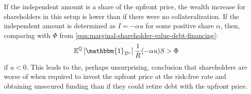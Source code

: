 \documentclass[../main.tex]{subfiles}
\begin{document}
        If the independent amount is a share of the upfront price, 
        the wealth increase for shareholders in this setup is lower than
        if there were no collateralization. 
        If the independent amount is determined as $I=-\alpha u$ for some positive share $\alpha$, 
        then, comparing with $\Phi$ from \cref*{eqn:marginal-shareholder-value-debt-financing}:
        \begin{equation}
            \mathbb{E}^{\mathbb{Q}}\left[
                \mathbbm{1}_{\mathcal{D}^{c}}
            \right] \discountfactor (-\alpha u) S
            >
            \Phi
        \end{equation}
        if $u<0$.
        This leads to the, perhaps unsurprising, conclusion
        that shareholders are worse of when required to invest the upfront price at the risk-free rate
        and obtaining unsecured funding
        than if they could retire debt with the upfront price.
\end{document}
